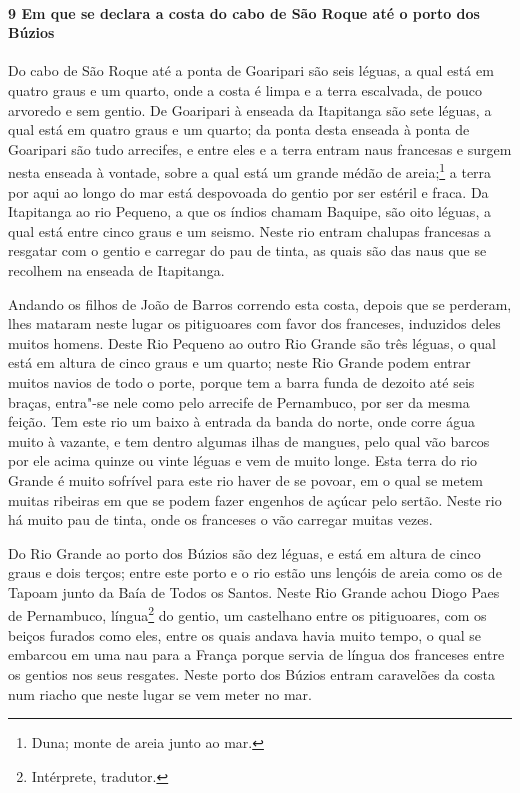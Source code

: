 \begin{linenumbers}
\paragraph{9 Em que se declara a costa do cabo de São Roque até o porto dos Búzios} \quad
Do cabo de São Roque até a ponta de Goaripari são seis léguas, a qual está em quatro graus
e um quarto, onde a costa é limpa e a terra escalvada, de pouco arvoredo e sem gentio. De
Goaripari à enseada da Itapitanga são sete léguas, a qual está em quatro graus e um
quarto; da ponta desta enseada à ponta de Goaripari são tudo arrecifes, e entre eles e a
terra entram naus francesas e surgem nesta enseada à vontade, sobre a qual está um grande
médão de areia;\footnote{ Duna; monte de areia junto ao mar.} a terra por aqui ao longo do mar
está despovoada do gentio por ser estéril e fraca. Da Itapitanga ao rio Pequeno, a que os
índios chamam Baquipe, são oito léguas, a qual está entre cinco graus e um seismo. Neste
rio entram chalupas francesas a resgatar com o gentio e carregar do pau de tinta, as quais
são das naus que se recolhem na enseada de Itapitanga.

Andando os filhos de João de Barros correndo esta costa, depois que se perderam, lhes
mataram neste lugar os pitiguoares com favor dos franceses, induzidos deles muitos homens.
Deste Rio Pequeno ao outro Rio Grande são três léguas, o qual está em altura de cinco
graus e um quarto; neste Rio Grande podem entrar muitos navios de todo o porte, porque tem
a barra funda de dezoito até seis braças, entra"-se nele como pelo arrecife de Pernambuco,
por ser da mesma feição. Tem este rio um baixo à entrada da banda do norte, onde corre
água muito à vazante, e tem dentro algumas ilhas de mangues, pelo qual vão barcos por ele
acima quinze ou vinte léguas e vem de muito longe. Esta terra do rio Grande é muito
sofrível para este rio haver de se povoar, em o qual se metem muitas ribeiras em que se
podem fazer engenhos de açúcar pelo sertão. Neste rio há muito pau de tinta, onde os
franceses o vão carregar muitas vezes.

Do Rio Grande ao porto dos Búzios são dez léguas, e está em altura de cinco graus e dois
terços; entre este porto e o rio estão uns lençóis de areia como os de Tapoam junto da
Baía de Todos os Santos. Neste Rio Grande achou Diogo Paes de Pernambuco, língua\footnote{ 
Intérprete, tradutor.} do gentio, um castelhano entre os pitiguoares, com os beiços
furados como eles, entre os quais andava havia muito tempo, o qual se embarcou em uma nau
para a França porque servia de língua dos franceses entre os gentios nos seus resgates.
Neste porto dos Búzios entram caravelões da costa num riacho que neste lugar se vem meter
no mar.


\end{linenumbers}
